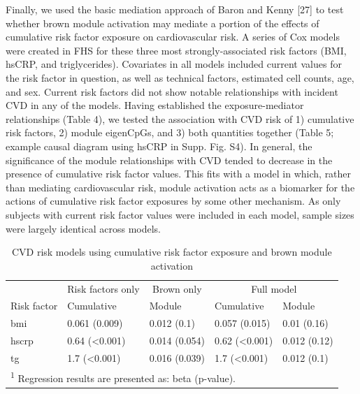 \documentclass[]{bmcart}
\theoremstyle{definition}
\theoremstyle{definition}
\theoremstyle{definition}
\theoremstyle{remark}
\begin{document}
Finally, we used the basic mediation approach of Baron and Kenny
{[}27{]} to test whether brown module activation may mediate a portion
of the effects of cumulative risk factor exposure on cardiovascular
risk. A series of Cox models were created in FHS for these three most
strongly-associated risk factors (BMI, hsCRP, and triglycerides).
Covariates in all models included current values for the risk factor in
question, as well as technical factors, estimated cell counts, age, and
sex. Current risk factors did not show notable relationships with
incident CVD in any of the models. Having established the
exposure-mediator relationships (Table 4), we tested the association
with CVD risk of 1) cumulative risk factors, 2) module eigenCpGs, and 3)
both quantities together (Table 5; example causal diagram using hsCRP in
Supp. Fig. S4). In general, the significance of the module relationships
with CVD tended to decrease in the presence of cumulative risk factor
values. This fits with a model in which, rather than mediating
cardiovascular risk, module activation acts as a biomarker for the
actions of cumulative risk factor exposures by some other mechanism. As
only subjects with current risk factor values were included in each
model, sample sizes were largely identical across models.

\begin{table}

\caption{\label{tab:module-mediation}CVD risk models using cumulative risk factor exposure and brown module activation}
\centering
\begin{tabular}[t]{lllll}
\toprule
\multicolumn{1}{c}{} & \multicolumn{1}{c}{Risk factors only} & \multicolumn{1}{c}{Brown only} & \multicolumn{2}{c}{Full model} \\
\cmidrule(l{2pt}r{2pt}){2-2} \cmidrule(l{2pt}r{2pt}){3-3} \cmidrule(l{2pt}r{2pt}){4-5}
Risk factor & Cumulative & Module & Cumulative & Module\\
\midrule
bmi & 0.061 (0.009) & 0.012 (0.1) & 0.057 (0.015) & 0.01 (0.16)\\
hscrp & 0.64 (<0.001) & 0.014 (0.054) & 0.62 (<0.001) & 0.012 (0.12)\\
tg & 1.7 (<0.001) & 0.016 (0.039) & 1.7 (<0.001) & 0.012 (0.1)\\
\bottomrule
\multicolumn{5}{l}{\textsuperscript{1} Regression results are presented as: beta (p-value).}\\
\end{tabular}
\end{table}
\end{document}
